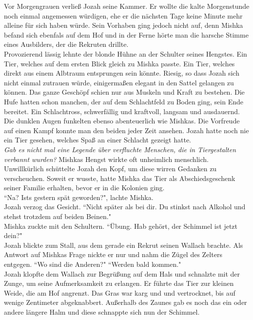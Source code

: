 Vor Morgengrauen verließ Jozah seine Kammer. Er wollte die kalte Morgenstunde noch einmal 
angemessen würdigen, ehe er die nächsten Tage keine Minute mehr alleine für sich haben würde. Sein 
Vorhaben ging jedoch nicht auf, denn Mishka befand sich ebenfals auf dem Hof und in der Ferne hörte 
man die harsche Stimme eines Ausbilders, der die Rekruten drillte.\\
Provozierend lässig lehnte der blonde Hühne an der Schulter seines Hengstes. Ein Tier, welches auf 
dem ersten Blick gleich zu Mishka passte. Ein Tier, welches direkt aus einem Albtraum entsprungen 
sein könnte. Riesig, so dass Jozah sich nicht einmal zutrauen würde, einigermaßen elegant in den 
Sattel gelangen zu können. Das ganze Geschöpf schien nur aus Muskeln und Kraft zu bestehen. Die 
Hufe hatten schon manchen, der auf dem Schlachtfeld zu Boden ging, sein Ende bereitet. Ein 
Schlachtross, schwerfällig und kraftvoll, langsam und ausdauernd. Die dunklen Augen funkelten 
ebenso abenteuerlich wie Mishkas. Die Vorfreude auf einen Kampf konnte man den beiden jeder Zeit 
ansehen. Jozah hatte noch nie ein Tier gesehen, welches Spaß an einer Schlacht gezeigt hatte. \\
\textit{Gab es nicht mal eine Legende über verfluchte Menschen, die in Tiergestalten verbannt 
wurden?}
Mishkas Hengst wirkte oft unheimlich menschlich. Unwillkürlich schüttelte Jozah den Kopf, um diese 
wirren Gedanken zu verscheuchen. Soweit er wusste, hatte Mishka das Tier als Abschiedsgeschenk 
seiner Familie erhalten, bevor er in die Kolonien ging.\\
``Na? Ists gestern spät geworden?", lachte Mishka.\\
Jozah verzog das Gesicht. ``Nicht später als bei dir. Du stinkst nach Alkohol und stehst trotzdem 
auf 
beiden Beinen."\\
Mishka zuckte mit den Schultern. ``Übung. Hab gehört, der Schimmel ist jetzt dein?"\\
Jozah blickte zum Stall, aus dem gerade ein Rekrut seinen Wallach brachte. Als Antwort auf Mishkas 
Frage nickte er nur und nahm die Zügel des Zelters entgegen. ``Wo sind die Anderen?"
``Werden bald kommen."\\
Jozah klopfte dem Wallach zur Begrüßung auf dem Hals und schnalzte mit der Zunge, um seine 
Aufmerksamkeit zu erlangen. Er führte das Tier zur kleinen Weide, die am Hof angrenzt. Das Gras war 
karg und und vertrocknet, bis auf wenige Zentimeter abgeknabbert. Außerhalb des Zaunes gab es noch 
das ein oder andere längere Halm und diese schnappte sich nun der Schimmel. 
